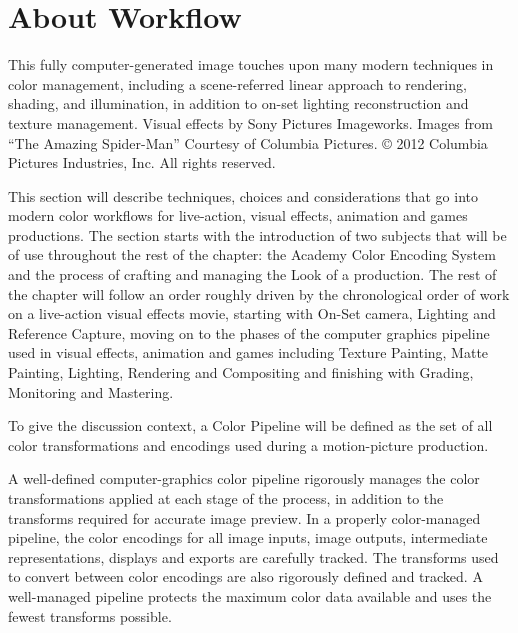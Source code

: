 \section{About Workflow}
\label{sec:about-workflow}

This fully computer-generated image touches upon many modern techniques in color management, including a scene-referred linear approach to rendering, shading, and illumination, in addition to on-set lighting reconstruction and texture management.
Visual effects by Sony Pictures Imageworks. Images from “The Amazing Spider-Man” Courtesy of Columbia Pictures. © 2012 Columbia Pictures Industries, Inc. All rights reserved.

This section will describe techniques, choices and considerations that go into modern color workflows for live-action, visual effects, animation and games productions. The section starts with the introduction of two subjects that will be of use throughout the rest of the chapter: the Academy Color Encoding System and the process of crafting and managing the Look of a production. The rest of the chapter will follow an order roughly driven by the chronological order of work on a live-action visual effects movie, starting with On-Set camera, Lighting and Reference Capture, moving on to the phases of the computer graphics pipeline used in visual effects, animation and games including Texture Painting, Matte Painting, Lighting, Rendering and Compositing and finishing with Grading, Monitoring and Mastering.

To give the discussion context, a Color Pipeline will be defined as the set of all color transformations and encodings used during a motion-picture production.

A well-defined computer-graphics color pipeline rigorously manages the color transformations applied at each stage of the process, in addition to the transforms required for accurate image preview.
In a properly color-managed pipeline, the color encodings for all image inputs, image outputs, intermediate representations, displays and exports are carefully tracked. The transforms used to convert between color encodings are also rigorously defined and tracked. A well-managed pipeline protects the maximum color data available and uses the fewest transforms possible.
